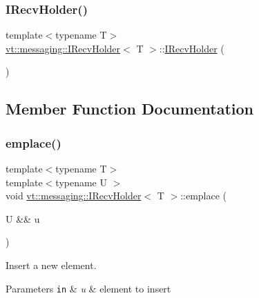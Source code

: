 \subsubsection{\texorpdfstring{I\+Recv\+Holder()}{IRecvHolder()}}
{\footnotesize\ttfamily template$<$typename T$>$ \\
\hyperlink{structvt_1_1messaging_1_1_i_recv_holder}{vt\+::messaging\+::\+I\+Recv\+Holder}$<$ T $>$\+::\hyperlink{structvt_1_1messaging_1_1_i_recv_holder}{I\+Recv\+Holder} (\begin{DoxyParamCaption}{ }\end{DoxyParamCaption})\hspace{0.3cm}{\ttfamily [default]}}



\subsection{Member Function Documentation}
\mbox{\label{structvt_1_1messaging_1_1_i_recv_holder_ab81d251a84cb2c8366eb5f5052ce002c}} 
\subsubsection{\texorpdfstring{emplace()}{emplace()}}
{\footnotesize\ttfamily template$<$typename T$>$ \\
template$<$typename U $>$ \\
void \hyperlink{structvt_1_1messaging_1_1_i_recv_holder}{vt\+::messaging\+::\+I\+Recv\+Holder}$<$ T $>$\+::emplace (\begin{DoxyParamCaption}\item[{U \&\&}]{u }\end{DoxyParamCaption})\hspace{0.3cm}{\ttfamily [inline]}}



Insert a new element. 


\begin{DoxyParams}[1]{Parameters}
\mbox{\tt in}  & {\em u} & element to insert \\
\hline
\end{DoxyParams}
\mbox{\label{structvt_1_1messaging_1_1_i_recv_holder_a5c25ae9371ef928b00c42405d9d00a38}} 
